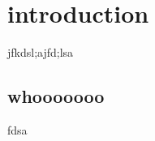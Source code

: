 \documentclass{mitthesis}
\begin{document}
\chapter{introduction}

jfkdsl;ajfd;lsa

\section{whooooooo}
fdsa
\end{document}
